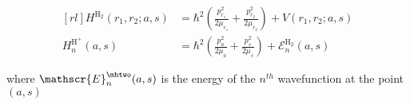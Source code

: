 %
%

\begin{equation}
    \begin{aligned}[rl]
         H^{\mathrm{H}_2}(r_1, r_2 ; a, s) &= \hbar^{2} ( \frac{p_{r_1}^2}{2 \mu_{r_1}} + \frac{p_{r_2}^2}{2 \mu_{r_2}} ) + V(r_1, r_2 ; a, s) \\
         H^{\mathrm{H}^{+}}_{n}(a, s) &= \hbar^{2} ( \frac{p_{a}^2}{2 \mu_{a}} + \frac{p_{s}^2}{2 \mu_{s}} ) + \mathscr{E}^{\mathrm{H}_2}_{n}(a, s)
     \end{aligned}
\label{eq:adiabatic_eqs}
\end{equation}

where $ \mathscr{E}^{\mhtwo}_{n}(a, s) $ is the energy of the $n^{th}$ \htwo wavefunction at the point $(a, s)$
%
%